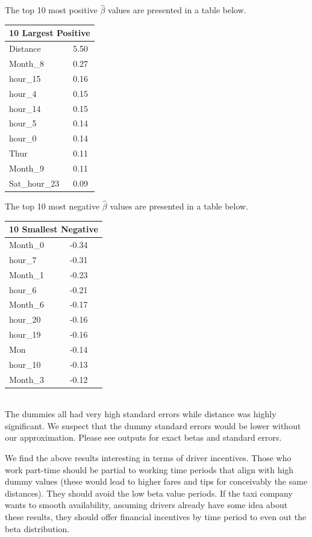 \documentclass[twoside]{article}
\begin{document}
\begin{multicols}{2}
The top 10 most positive $\hat{\beta}$ values are presented in a table below. 

\begin{tabular}{ |l|l| }
  \hline
  \multicolumn{2}{|c|}{10 Largest Positive} \\
  \hline
Distance &	5.50 \\
 Month\_8  &	0.27\\
 hour\_15 &	0.16\\
 hour\_4 &	0.15\\
 hour\_14 &	0.15\\
 hour\_5 &	0.14\\
 hour\_0 &	0.14\\
 Thur &	0.11\\
 Month\_9 &	0.11\\
 Sat\_hour\_23 & 	0.09\\
  \hline
\end{tabular}

The top 10 most negative $\hat{\beta}$ values are presented in a table below. \\

\begin{tabular}{ |l|l| }
  \hline
  \multicolumn{2}{|c|}{10 Smallest Negative} \\
  \hline
 Month\_0 &	-0.34\\
 hour\_7 &	-0.31\\
 Month\_1 &	-0.23\\
 hour\_6 & 	-0.21\\
 Month\_6 &	-0.17\\
 hour\_20 &	-0.16\\
 hour\_19 &	-0.16\\
 Mon &	-0.14\\
 hour\_10 &	-0.13\\
 Month\_3 &	-0.12\\
  \hline
\end{tabular}\\


The dummies all had very high standard errors while distance was highly significant. We suspect that the dummy standard errors would be lower without our approximation.  Please see outputs for exact betas and standard errors.

We find the above results interesting in terms of driver incentives. Those who work part-time should be partial to working time periods that align with high dummy values (these would lead to higher fares and tips for conceivably the same distances). They should avoid the low beta value periods. If the taxi company wants to smooth availability, assuming drivers already have some idea about these results, they should offer financial incentives by time period to even out the beta distribution. 


\end{multicols}
\end{document}
